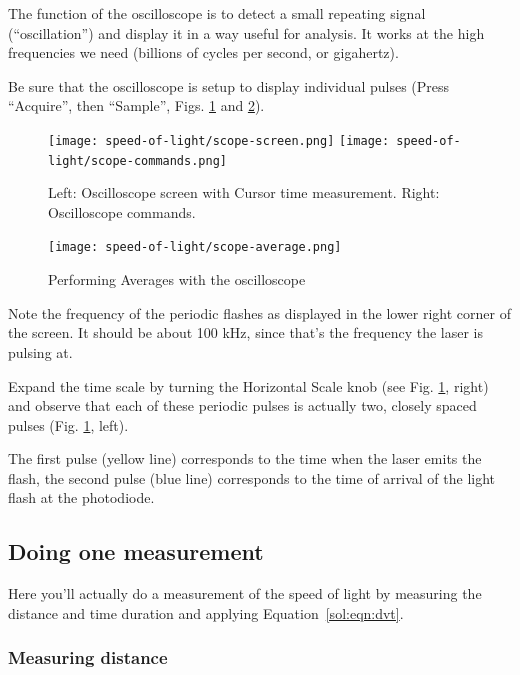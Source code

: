 The function of the oscilloscope is to detect a small repeating signal (``oscillation'') and display it in a way useful for analysis. It works at the high frequencies we need (billions of cycles per second, or gigahertz).

\begin{steps}
	\item Be sure that the oscilloscope is setup to display individual pulses (Press “Acquire”, then “Sample”, Figs. \ref{sol:fig:scope-parts} and \ref{sol:fig:scope-average}).

\begin{figure}
	\centering
	\texttt{[image: speed-of-light/scope-screen.png]}%
	\texttt{[image: speed-of-light/scope-commands.png]}
	\caption{Left: Oscilloscope screen with Cursor time measurement. Right: Oscilloscope commands.}\label{sol:fig:scope-parts}
\end{figure}

\begin{figure}
	\centering
	\texttt{[image: speed-of-light/scope-average.png]}
	\caption{Performing Averages with the oscilloscope}\label{sol:fig:scope-average}
\end{figure}

	\item Note the frequency of the periodic flashes as displayed in the lower right corner of the screen. It should be about 100 kHz, since that's the frequency the laser is pulsing at.
	
	\item Expand the time scale by turning the Horizontal Scale knob (see Fig. \ref{sol:fig:scope-parts}, right) and observe that each of these periodic pulses is actually two, closely spaced pulses (Fig. \ref{sol:fig:scope-parts}, left).
	
\end{steps}

The first pulse (yellow line) corresponds to the time when the laser emits the flash, the second pulse (blue line) corresponds to the time of arrival of the light flash at the photodiode.

\subsection{Doing one measurement}

Here you'll actually do a measurement of the speed of light by measuring the distance and time duration and applying Equation\ \ref{sol:eqn:dvt}.

\subsubsection{Measuring distance}

